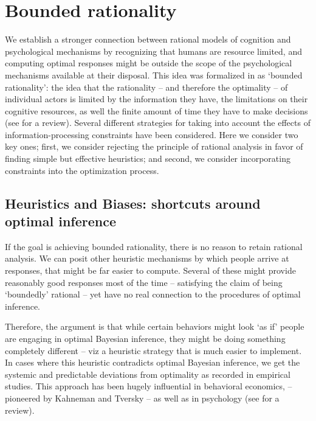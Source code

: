 \section{Bounded rationality}

We establish a stronger connection between rational models of cognition and psychological mechanisms by recognizing that humans are resource limited, and computing optimal responses might be outside the scope of the psychological mechanisms available at their disposal. This idea was formalized in \citet{simon1955behavioral} as `bounded rationality': the idea that the rationality -- and therefore the optimality -- of individual actors is limited by the information they have, the limitations on their cognitive resources, as well the finite amount of time they have to make decisions (see \citet{russell2016rationality} for a review). Several different strategies for taking into account the effects of information-processing constraints have been considered. Here we consider two key ones; first, we consider rejecting the principle of rational analysis in favor of finding simple but effective heuristics; and second, we consider incorporating constraints into the optimization process.

\subsection{Heuristics and Biases: shortcuts around optimal inference}

If the goal is achieving bounded rationality, there is no reason to retain rational analysis. We can posit other heuristic mechanisms by which people arrive at responses, that might be far easier to compute. Several of these might provide reasonably good responses most of the time -- satisfying the claim of being `boundedly' rational -- yet have no real connection to the procedures of optimal inference. 

Therefore, the argument is that while certain behaviors might look `as if' people are engaging in optimal Bayesian inference, they might be doing something completely different -- viz a heuristic strategy that is much easier to implement. In cases where this heuristic contradicts optimal Bayesian inference, we get the systemic and predictable deviations from optimality as recorded in empirical studies. This approach has been hugely influential in behavioral economics, -- pioneered by Kahneman and Tversky\cite{tversky} -- as well as in psychology (see \citet{gigerenzer2002bounded} for a review). 

